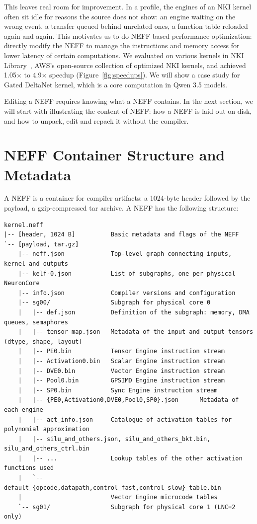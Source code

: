 \documentclass{article}
\begin{document}
This leaves real room for improvement. In a profile, the engines of an NKI kernel often sit idle for reasons the source does not show: an engine waiting on the wrong event, a transfer queued behind unrelated ones, a function table reloaded again and again. This motivates us to do NEFF-based performance optimization: directly modify the NEFF to manage the instructions and memory access for lower latency of certain computations. We evaluated on various kernels in NKI Library~\citep{nki_library}, AWS's open-source collection of optimized NKI kernels, and achieved 1.05$\times$ to 4.9$\times$ speedup (Figure~\ref{fig:speedups}). We will show a case study for Gated DeltaNet kernel, which is a core computation in Qwen 3.5 models.

Editing a NEFF requires knowing what a NEFF contains. In the next section, we will start with illustrating the content of NEFF: how a NEFF is laid out on disk, and how to unpack, edit and repack it without the compiler.

\section{NEFF Container Structure and Metadata}
\label{sec:container}

A NEFF is a container for compiler artifacts: a 1024-byte header followed by the payload, a gzip-compressed tar archive. A NEFF has the following structure:

\begin{lstlisting}
kernel.neff
|-- [header, 1024 B]          Basic metadata and flags of the NEFF
`-- [payload, tar.gz]
    |-- neff.json             Top-level graph connecting inputs, kernel and outputs
    |-- kelf-0.json           List of subgraphs, one per physical NeuronCore
    |-- info.json             Compiler versions and configuration
    |-- sg00/                 Subgraph for physical core 0
    |   |-- def.json          Definition of the subgraph: memory, DMA queues, semaphores
    |   |-- tensor_map.json   Metadata of the input and output tensors (dtype, shape, layout)
    |   |-- PE0.bin           Tensor Engine instruction stream
    |   |-- Activation0.bin   Scalar Engine instruction stream
    |   |-- DVE0.bin          Vector Engine instruction stream
    |   |-- Pool0.bin         GPSIMD Engine instruction stream
    |   |-- SP0.bin           Sync Engine instruction stream
    |   |-- {PE0,Activation0,DVE0,Pool0,SP0}.json      Metadata of each engine
    |   |-- act_info.json     Catalogue of activation tables for polynomial approximation
    |   |-- silu_and_others.json, silu_and_others_bkt.bin, silu_and_others_ctrl.bin
    |   |-- ...               Lookup tables of the other activation functions used
    |   `-- default_{opcode,datapath,control_fast,control_slow}_table.bin
    |                         Vector Engine microcode tables
    `-- sg01/                 Subgraph for physical core 1 (LNC=2 only)
\end{lstlisting}
\end{document}
